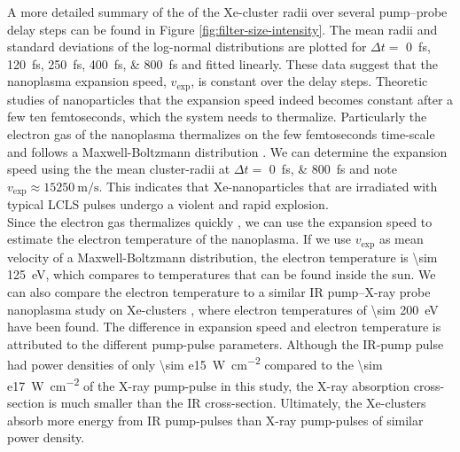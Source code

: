 %
A more detailed summary of the of the Xe-cluster radii over several pump--probe delay steps can be found in Figure \ref{fig:filter-size-intensity}. The mean radii and standard deviations of the log-normal distributions are plotted for $\Delta t=$ \SIlist{0;120;250;400;800}{\femto\second} and fitted linearly. These data suggest that the nanoplasma expansion speed, $v_{\text{exp}}$, is constant over the delay steps. Theoretic studies of nanoparticles \cite{Hau-Riege-2004-PRE,Mikaberidze-2008-PRA} that the expansion speed indeed becomes constant after a few ten femtoseconds, which the system needs to thermalize. Particularly the electron gas of the nanoplasma thermalizes on the few femtoseconds time-scale and follows a Maxwell-Boltzmann distribution \cite{Arbeiter-2011-NJP}. We can determine the expansion speed using the the mean cluster-radii at $\Delta t=$ \SIlist{0;800}{\femto\second} and note $v_{\text{exp}}\approx \SI{15250}{\meter\per\second}$. This indicates that Xe-nanoparticles that are irradiated with typical LCLS pulses undergo a violent and rapid explosion.\\[1\baselineskip]
%
Since the electron gas thermalizes quickly \cite{Arbeiter-2011-NJP}, we can use the expansion speed to estimate the electron temperature of the nanoplasma. If we use $v_{\text{exp}}$ as mean velocity of a Maxwell-Boltzmann distribution, the electron temperature is \SI{\sim 125}{\electronvolt}, which compares to temperatures that can be found inside the sun. We can also compare the electron temperature to a similar IR pump--X-ray probe nanoplasma study on Xe-clusters \citep{Gorkhover-2016-NatPho}, where electron temperatures of \SI{\sim 200}{\electronvolt} have been found. The difference in expansion speed and electron temperature is attributed to the different pump-pulse parameters. Although the IR-pump pulse had power densities of only \SI{\sim e15}{\watt\per\square\centi\meter} compared to the \SI{\sim e17}{\watt\per\square\centi\meter} of the X-ray pump-pulse in this study, the X-ray absorption cross-section is much smaller than the IR cross-section. Ultimately, the Xe-clusters absorb more energy from IR pump-pulses than X-ray pump-pulses of similar power density.\\[1\baselineskip]
